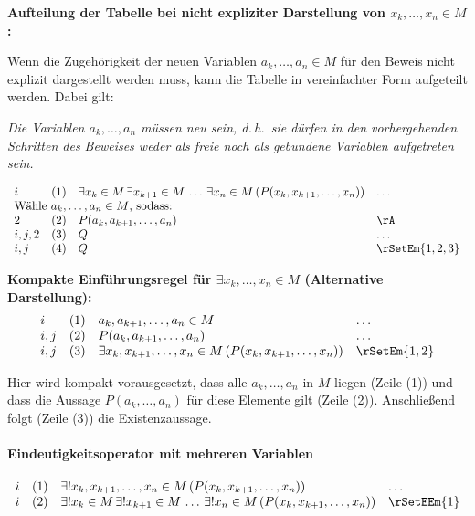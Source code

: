 \documentclass{book}
\theoremstyle{plain}
\theoremstyle{remark}
\theoremstyle{definition}
\begin{document}
\noindent
\textbf{Aufteilung der Tabelle bei nicht expliziter Darstellung von \(x_k, \ldots, x_n \in M\):}

Wenn die Zugehörigkeit der neuen Variablen \(a_k, \ldots, a_n \in M\) für den Beweis nicht explizit dargestellt werden muss, kann die Tabelle in vereinfachter Form aufgeteilt werden. Dabei gilt:

\textit{Die Variablen \(a_k, \ldots, a_n\) müssen neu sein, d.\,h.\ sie dürfen in den vorhergehenden Schritten des Beweises weder als freie noch als gebundene Variablen aufgetreten sein.}

\[
\begin{array}{llll}
    i & (1) & \exists x_k \in M \, \exists x_{k+1} \in M \, \ldots \, \exists x_n \in M \, (P(x_k, x_{k+1}, \ldots, x_n)) & \dots \\
    \multicolumn{4}{l}{\text{Wähle \(a_k, \ldots, a_n \in M\), sodass:}}\\
    2 & (2) & P(a_k, a_{k+1}, \ldots, a_n) & \rA \\
    i,j,2 & (3) & Q & \dots \\
    i,j & (4) & Q & \rSetEm{1,2,3} \\
\end{array}
\]

\bigskip

\noindent
\textbf{Kompakte Einführungsregel für \(\exists x_k, \ldots, x_n \in M\) (Alternative Darstellung):}
\[
\begin{array}{llll}
    i & (1) & a_k, a_{k+1}, \ldots, a_n \in M & \dots \\
    i,j & (2) & P(a_k, a_{k+1}, \ldots, a_n) & \dots \\
    i,j & (3) & \exists x_k, x_{k+1}, \ldots, x_n \in M \, (P(x_k, x_{k+1}, \ldots, x_n)) & \rSetEm{1,2} \\
\end{array}
\]

\noindent
Hier wird kompakt vorausgesetzt, dass alle \(a_k, \ldots, a_n\) in \(M\) liegen (Zeile (1)) und dass die Aussage \(P(a_k,\ldots,a_n)\) für diese Elemente gilt (Zeile (2)). Anschließend folgt (Zeile (3)) die Existenzaussage.

\paragraph{Eindeutigkeitsoperator mit mehreren Variablen}
\label{rule:rSetEEm} 
\[
\begin{array}{llll}
    i & (1) & \exists! x_k, x_{k+1}, \ldots, x_n \in M \, (P(x_k, x_{k+1}, \ldots, x_n)) & \dots \\
    i & (2) & \exists! x_k \in M \, \exists! x_{k+1} \in M \, \ldots \, \exists! x_n \in M \, (P(x_k, x_{k+1}, \ldots, x_n)) 
            & \rSetEEm{1} \\
\end{array}
\]
\end{document}

